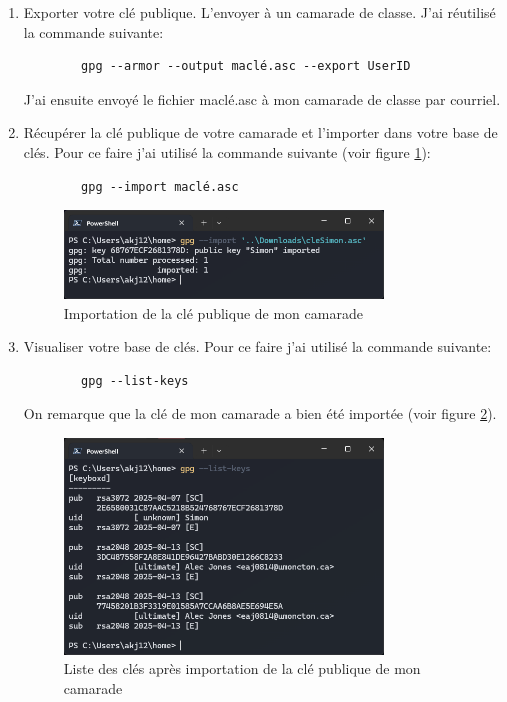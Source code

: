 \documentclass[12pt,a4paper]{article}
\begin{document}
\begin{enumerate}[label=\Roman*]
    \item Exporter votre clé publique. L'envoyer à un camarade de classe. J'ai réutilisé la commande suivante:
          \begin{verbatim}
        gpg --armor --output maclé.asc --export UserID
    \end{verbatim}
          J'ai ensuite envoyé le fichier maclé.asc à mon camarade de classe par courriel.

    \item Récupérer la clé publique de votre camarade et l'importer dans votre base de clés.
          Pour ce faire j'ai utilisé la commande suivante (voir figure \ref{import}):
          \begin{verbatim}
        gpg --import maclé.asc
    \end{verbatim}

          \begin{figure}[ht]
              \centering
              \includegraphics[width=0.8\textwidth]{../img/importCle.png}
              \caption{Importation de la clé publique de mon camarade}
              \label{import}
          \end{figure}


    \item Visualiser votre base de clés.
          Pour ce faire j'ai utilisé la commande suivante:
          \begin{verbatim}
        gpg --list-keys
    \end{verbatim}
          On remarque que la clé de mon camarade a bien été importée (voir figure \ref{listKeysSimon}).

          \begin{figure}[ht]
              \centering
              \includegraphics[width=0.8\textwidth]{../img/listKeysSimon.png}
              \caption{Liste des clés après importation de la clé publique de mon camarade}
              \label{listKeysSimon}
          \end{figure}


\end{enumerate}
\end{document}
